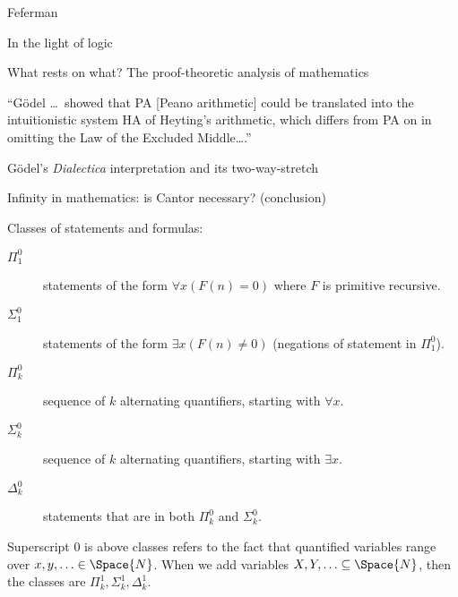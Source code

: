 \begin{plSection}{Feferman}
\begin{plSection}{In the light of logic}
\begin{plSection}{What rests on what? The proof-theoretic analysis of mathematics}

``G\"{o}del \ldots\ showed that PA [Peano arithmetic]
could be translated into the intuitionistic system HA of
Heyting's arithmetic,
which differs from PA on in omitting the 
Law of the Excluded Middle{\ldots}.''~\cite[190]{Feferman:1998:LightOfLogic}

\end{plSection}%
\begin{plSection}{G\"{o}del's \textit{Dialectica} interpretation and its two-way-stretch}
\label{sec:Godels_Dialectica_interpretation}


\end{plSection}%
\begin{plSection}{Infinity in mathematics: is Cantor necessary? (conclusion)}
\label{sec:Cantor_necessary_conclusion}


Classes of statements and formulas:
\begin{description}
\item[$\Pi^0_1$] statements of the form
$\forall x (F(n) = 0)$ where $F$ is primitive recursive.
\item[$\Sigma^0_1$] statements of the form
$\exists x (F(n) \neq 0)$ (negations of statement in $\Pi^0_1$).
\item[$\Pi^0_k$] sequence of $k$ alternating quantifiers,
starting with $\forall x$.
\item[$\Sigma^0_k$] sequence of $k$ alternating quantifiers,
starting with $\exists x$.
\item[$\Delta^0_k$] statements that are in both $\Pi^0_k$
and $\Sigma^0_k$. 
\end{description}
Superscript $0$ is above classes refers to the fact that
quantified variables range over $x,y,\ldots \in \Space{N}$.
When we add variables $X,Y,\ldots \subseteq \Space{N}$,
then the classes are $\Pi^1_k, \Sigma^1_k, \Delta^1_k$.


\end{plSection}
\end{plSection}
\end{plSection}
